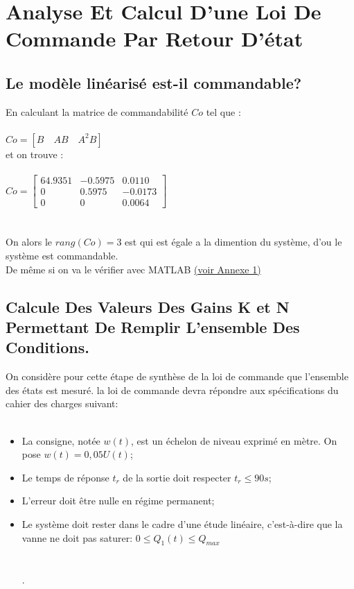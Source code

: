 \chapter{Analyse  Et Calcul  D’une Loi De Commande  Par Retour  D’état }

 \section{Le modèle linéarisé est-il commandable?}
 En calculant la matrice de commandabilité $Co$ tel que : \\\\
 $Co=[B\quad AB \quad A^{2}B]$\\
 et on trouve :\\\\
 
 $Co=\begin{bmatrix} 
64.9351 & -0.5975 & 0.0110 \\
0 & 0.5975 & -0.0173 \\
0 & 0 & 0.0064  
\end{bmatrix}$\\\\\\
 
On alors le $rang(Co)=3$ est qui est égale a la dimention du système, d'ou le système est commandable.\\  
De même si on va le vérifier avec MATLAB  \hyperref[section1.1]{(voir Annexe 1)}\label{annexe1}\\
 
 
 
 
 \section{Calcule Des Valeurs Des Gains K et N Permettant De Remplir L’ensemble Des Conditions.}
  
On considère pour cette étape de synthèse de la loi de commande que l'ensemble des états est mesuré. la loi de commande devra répondre aux spécifications du cahier des charges suivant: \\\\

\begin{itemize}
\item La consigne, notée $w(t)$, est un échelon de niveau exprimé en mètre. On pose $w(t) = 0, 05U(t)$;
\item Le temps de réponse $t_{r}$ de la sortie doit respecter $t_{r} \leq 90 s$;
\item L’erreur doit être nulle en régime permanent;
\item Le système doit rester dans le cadre d’une étude linéaire, c’est-à-dire que la vanne ne doit pas saturer:
$0 \leq Q_{1}(t) \leq Q_{max}$ \cite{ref1}\\\\\\ .
\end{itemize} 
 
